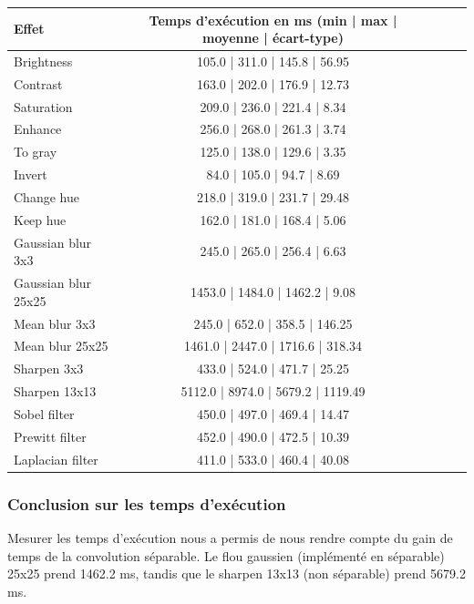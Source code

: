 \begin{tabular}{||l||c|c||c|c||}
    \hline
    \hline
    \textbf{Effet} & \textbf{Temps d'exécution en ms} (min | max | moyenne | écart-type)\\
    \hline
    \hline
    Brightness & 105.0 | 311.0 | 145.8 | 56.95\\
    \hline
    Contrast & 163.0 | 202.0 | 176.9 | 12.73\\
    \hline
    Saturation & 209.0 | 236.0 | 221.4 | 8.34\\
    \hline
    Enhance & 256.0 | 268.0 | 261.3 | 3.74\\
    \hline
    To gray & 125.0 | 138.0 | 129.6 | 3.35\\
    \hline
    Invert & 84.0 | 105.0 | 94.7 | 8.69\\
    \hline
    Change hue & 218.0 | 319.0 | 231.7 | 29.48\\
    \hline
    Keep hue & 162.0 | 181.0 | 168.4 | 5.06\\
    \hline
    Gaussian blur 3x3 & 245.0 | 265.0 | 256.4 | 6.63\\
    \hline
    Gaussian blur 25x25 & 1453.0 | 1484.0 | 1462.2 | 9.08\\
    \hline
    Mean blur 3x3 & 245.0 | 652.0 | 358.5 | 146.25\\
    \hline
    Mean blur 25x25 & 1461.0 | 2447.0 | 1716.6 | 318.34\\
    \hline
    Sharpen 3x3 & 433.0 | 524.0 | 471.7 | 25.25\\
    \hline
    Sharpen 13x13 & 5112.0 | 8974.0 | 5679.2 | 1119.49\\
    \hline
    Sobel filter & 450.0 | 497.0 | 469.4 | 14.47\\
    \hline
    Prewitt filter & 452.0 | 490.0 | 472.5 | 10.39\\
    \hline
    Laplacian filter & 411.0 | 533.0 | 460.4 | 40.08\\
    \hline
    \hline
  \end{tabular}

\subsubsection*{Conclusion sur les temps d'exécution}

Mesurer les temps d'exécution nous a permis de nous rendre compte du gain de temps de la convolution séparable. Le flou gaussien (implémenté en séparable) 25x25 prend 1462.2 ms, tandis que le sharpen 13x13 (non séparable) prend 5679.2 ms.  

